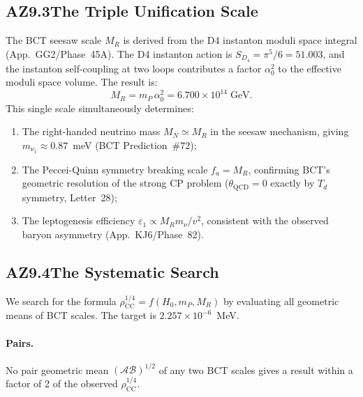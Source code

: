 \documentclass[aps,prl,twocolumn,showpacs,preprintnumbers]{revtex4-2}
\newcommand{\azero}{\alpha_0}
\newcommand{\SD}{S_{D_4}}
\newcommand{\mP}{m_P}
\newcommand{\MR}{M_R}
\newcommand{\rhoCC}{\rho_{\mathrm{CC}}}
\newcommand{\Hzero}{H_0}
\begin{document}
\subsection*{AZ9.3\quad The Triple Unification Scale}

The BCT seesaw scale $\MR$ is derived from the D4 instanton moduli space
integral (App.~GG2/Phase~45A). The D4 instanton action is
$\SD = \pi^5/6 = 51.003$, and the instanton self-coupling at two loops
contributes a factor $\azero^2$ to the effective moduli space volume.
The result is:
\begin{equation}
  \MR = \mP\,\azero^2 = 6.700\times10^{14}\;\text{GeV}.
  \label{eq:MR_app}
\end{equation}
This single scale simultaneously determines:
\begin{enumerate}
  \item The right-handed neutrino mass $M_N \simeq \MR$ in the seesaw
    mechanism, giving $m_{\nu_1} \approx 0.87$~meV (BCT Prediction~\#72);
  \item The Peccei-Quinn symmetry breaking scale $f_a = \MR$, confirming
    BCT's geometric resolution of the strong CP problem
    ($\theta_{\mathrm{QCD}} = 0$ exactly by $T_d$ symmetry, Letter~28);
  \item The leptogenesis efficiency $\varepsilon_1 \propto \MR m_\nu/v^2$,
    consistent with the observed baryon asymmetry (App.~KJ6/Phase~82).
\end{enumerate}

\subsection*{AZ9.4\quad The Systematic Search}

We search for the formula $\rhoCC^{1/4} = f(\Hzero, \mP, \MR)$ by
evaluating all geometric means of BCT scales. The target is
$2.257\times10^{-6}$~MeV.

\paragraph{Pairs.} No pair geometric mean $(\mathcal{A}\mathcal{B})^{1/2}$
of any two BCT scales gives a result within a factor of 2 of the observed
$\rhoCC^{1/4}$.
\end{document}

